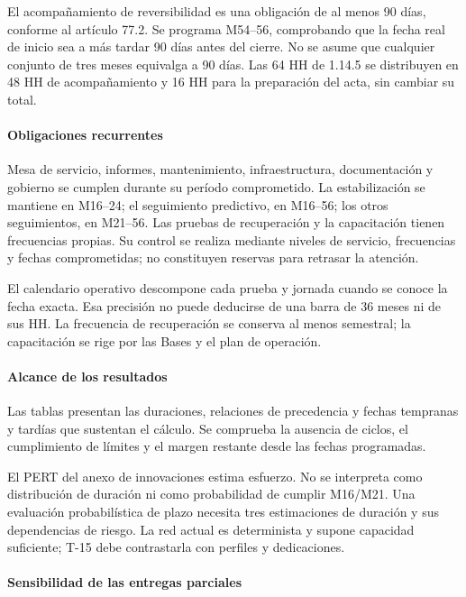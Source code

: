 El acompañamiento de reversibilidad es una obligación de al menos 90 días, conforme al artículo 77.2. Se programa M54–56, comprobando que la fecha real de inicio sea a más tardar 90 días antes del cierre. No se asume que cualquier conjunto de tres meses equivalga a 90 días. Las 64 HH de 1.14.5 se distribuyen en 48 HH de acompañamiento y 16 HH para la preparación del acta, sin cambiar su total.

\paragraph{Obligaciones recurrentes}

Mesa de servicio, informes, mantenimiento, infraestructura, documentación y gobierno se cumplen durante su período comprometido. La estabilización se mantiene en M16–24; el seguimiento predictivo, en M16–56; los otros seguimientos, en M21–56. Las pruebas de recuperación y la capacitación tienen frecuencias propias. Su control se realiza mediante niveles de servicio, frecuencias y fechas comprometidas; no constituyen reservas para retrasar la atención.

El calendario operativo descompone cada prueba y jornada cuando se conoce la fecha exacta. Esa precisión no puede deducirse de una barra de 36 meses ni de sus HH. La frecuencia de recuperación se conserva al menos semestral; la capacitación se rige por las Bases y el plan de operación.

\paragraph{Alcance de los resultados}

Las tablas presentan las duraciones, relaciones de precedencia y fechas tempranas y tardías que sustentan el cálculo. Se comprueba la ausencia de ciclos, el cumplimiento de límites y el margen restante desde las fechas programadas.

El PERT del anexo de innovaciones estima esfuerzo. No se interpreta como distribución de duración ni como probabilidad de cumplir M16/M21. Una evaluación probabilística de plazo necesita tres estimaciones de duración y sus dependencias de riesgo. La red actual es determinista y supone capacidad suficiente; T-15 debe contrastarla con perfiles y dedicaciones.

\paragraph{Sensibilidad de las entregas parciales}

